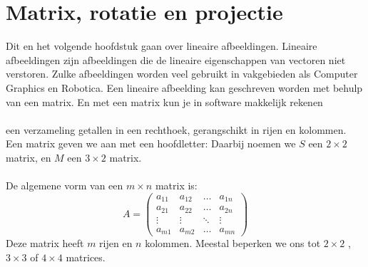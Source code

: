 \chapter{Matrix, rotatie en projectie}
\label{chap: matrix, rotatie en projectie}

Dit en het volgende hoofdstuk gaan over lineaire afbeeldingen. Lineaire afbeeldingen zijn afbeeldingen die de lineaire eigenschappen van  vectoren niet verstoren. Zulke afbeeldingen worden veel gebruikt in vakgebieden als Computer Graphics en Robotica. Een lineaire afbeelding kan geschreven worden met behulp van een matrix. En met een matrix kun je in software makkelijk rekenen\\ \\
{een verzameling getallen in een rechthoek, gerangschikt in rijen en kolommen.}\\
Een matrix geven we aan met een hoofdletter:
Daarbij noemen we $S$ een $ 2 \times 2 $ matrix, en $M$ een $ 3 \times 2 $ matrix. \\ \\
De algemene vorm van een $ m \times n $ matrix is:
$$
A = \begin{pmatrix}
a_{11} &  a_{12}  & \ldots & a_{1n}\\
a_{21}  &  a_{22} & \ldots & a_{2n}\\
\vdots & \vdots & \ddots & \vdots\\
a_{m1}  &   a_{m2}       &\ldots & a_{mn}
\end{pmatrix}
$$
Deze matrix heeft $ m $ rijen en $ n $ kolommen. Meestal beperken we ons tot $ 2 \times 2 $ , \  $ 3 \times 3 $ of $ 4 \times 4 $ matrices.
